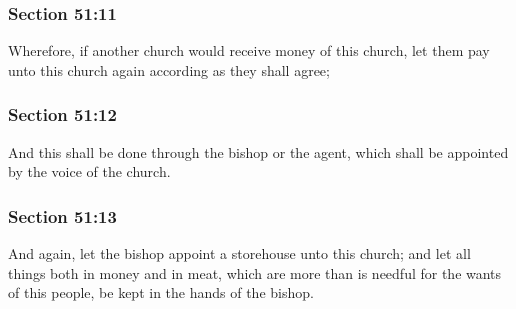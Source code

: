 	\subsubsection{Section 51:11} %
		\label{DC51-11}

		Wherefore, if another church would receive money of this church, let them pay unto this church again according as they shall agree;


	\subsubsection{Section 51:12} %
		\label{DC51-12}

		And this shall be done through the bishop or the agent, which shall be appointed by the voice of the church.


	\subsubsection{Section 51:13} %
		\label{DC51-13}

		And again, let the bishop appoint a storehouse unto this church; and let all things both in money and in meat, which are more than is needful for the wants of this people, be kept in the hands of the bishop.


